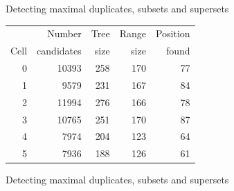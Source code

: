 \documentclass{beamer}
\begin{document}
\begin{frame}{Detecting maximal duplicates, subsets and supersets}
        \begin{table}[ht]
                \centering
                \begin{tabular}{rrrrr}
                        \toprule
                               & Number & Tree & Range & Position \\
                        Cell & candidates & size & size & found \\
                        \midrule
                        0 & 10393 & 258 & 170 & 77 \\
                        1 & 9579 & 231 & 167 & 84 \\
                        2 & 11994 & 276 & 166 & 78 \\
                        3 & 10765 & 251 & 170 & 87 \\
                        4 & 7974 & 204 & 123 & 64 \\
                        5 & 7936 & 188 & 126 & 61 \\
                        \bottomrule
                \end{tabular}
        \end{table}
\end{frame}

\begin{frame}{Detecting maximal duplicates, subsets and supersets}
    \centering
\end{frame}
\end{document}
